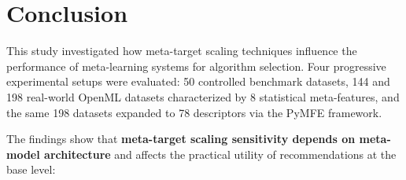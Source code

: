 \documentclass[12pt]{article}
\begin{document}
\begin{table}[ht]
\centering
\caption{Consistency of findings across the four experimental scenarios.}
\label{tab:consistency}
%
\end{table}

\section{Conclusion}

This study investigated how meta-target scaling techniques influence the performance of meta-learning systems for algorithm selection. Four progressive experimental setups were evaluated: 50 controlled benchmark datasets, 144 and 198 real-world OpenML datasets characterized by 8 statistical meta-features, and the same 198 datasets expanded to 78 descriptors via the PyMFE framework.

The findings show that \textbf{meta-target scaling sensitivity depends on meta-model architecture} and affects the practical utility of recommendations at the base level:
\end{document}
